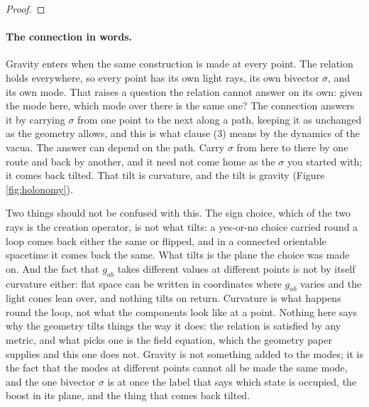 \documentclass[11pt]{article}
\theoremstyle{definition}
\begin{document}
\begin{proof}
\end{proof}

\paragraph{The connection in words.} Gravity enters when the same construction is made at every point. The relation holds everywhere, so every point has its own light rays, its own bivector $\sigma$, and its own mode. That raises a question the relation cannot answer on its own: given the mode here, which mode over there is the same one? The connection answers it by carrying $\sigma$ from one point to the next along a path, keeping it as unchanged as the geometry allows, and this is what clause (3) means by the dynamics of the vacua. The answer can depend on the path. Carry $\sigma$ from here to there by one route and back by another, and it need not come home as the $\sigma$ you started with; it comes back tilted. That tilt is curvature, and the tilt is gravity (Figure \ref{fig:holonomy}).

Two things should not be confused with this. The sign choice, which of the two rays is the creation operator, is not what tilts: a yes-or-no choice carried round a loop comes back either the same or flipped, and in a connected orientable spacetime it comes back the same. What tilts is the plane the choice was made on. And the fact that $g_{ab}$ takes different values at different points is not by itself curvature either: flat space can be written in coordinates where $g_{ab}$ varies and the light cones lean over, and nothing tilts on return. Curvature is what happens round the loop, not what the components look like at a point. Nothing here says why the geometry tilts things the way it does: the relation is satisfied by any metric, and what picks one is the field equation, which the geometry paper supplies \cite[Thm.~4.5]{ButlerT6} and this one does not. Gravity is not something added to the modes; it is the fact that the modes at different points cannot all be made the same mode, and the one bivector $\sigma$ is at once the label that says which state is occupied, the boost in its plane, and the thing that comes back tilted.
\end{document}
